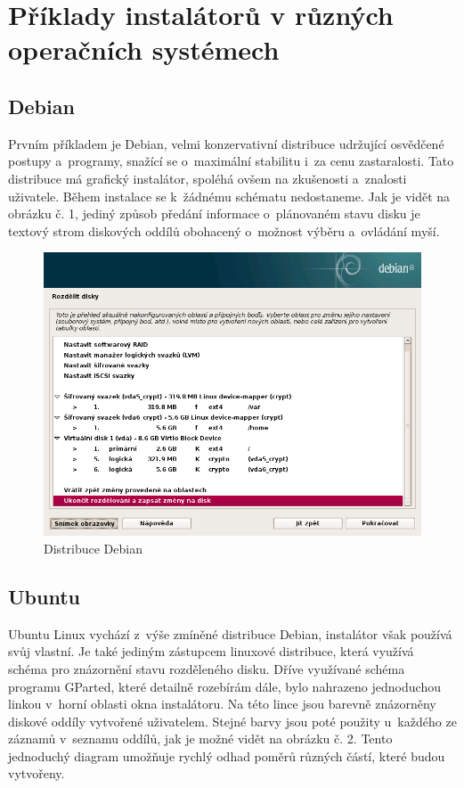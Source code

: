 \documentclass[color,table,oneside,nolot,nolof]{fithesis}
\begin{document}
\section{Příklady instalátorů v různých operačních systémech}

\subsection{Debian}

Prvním příkladem je Debian, velmi konzervativní distribuce udržující osvědčené postupy a~programy, snažící se o~maximální stabilitu i~za cenu zastaralosti. 
Tato distribuce má grafický instalátor, spoléhá ovšem na zkušenosti a~znalosti uživatele. Během instalace se k~žádnému schématu nedostaneme. Jak je vidět na obrázku č. 1, jediný způsob předání 
informace o~plánovaném stavu disku je textový strom diskových oddílů obohacený o~možnost výběru a~ovládání myší.

\begin{figure}[hb]
	\caption{Distribuce Debian}
	\centering
	\includegraphics[width=.6\columnwidth]{pictures/debian1.png}
\end{figure}

\subsection{Ubuntu}

Ubuntu Linux vychází z~výše zmíněné distribuce Debian, instalátor však používá svůj vlastní. Je také jediným zástupcem linuxové distribuce, která využívá  schéma 
pro znázornění stavu rozděleného disku. Dříve využívané schéma programu GParted, které detailně rozebírám dále, bylo nahrazeno jednoduchou linkou v~horní oblasti okna instalátoru. Na této lince 
jsou barevně znázorněny diskové 
oddíly vytvořené uživatelem. Stejné barvy jsou poté použity u~každého ze záznamů v~seznamu oddílů, jak je možné vidět na obrázku č. 2. Tento jednoduchý diagram umožňuje rychlý odhad poměrů různých 
částí, které budou vytvořeny.
\end{document}
